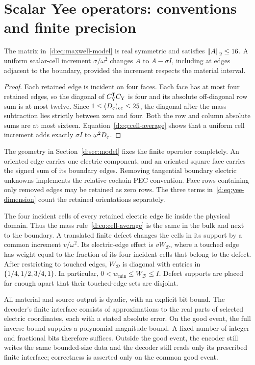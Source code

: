 \section{Scalar Yee operators: conventions and finite precision}\label{d:app:model}
\begin{lemma}\label{d:lem:pec}
The matrix in~\eqref{d:eq:maxwell-model} is real symmetric and satisfies $\left\lVert A\right\rVert_2\le16$. A uniform scalar-cell increment $\sigma/\omega^2$ changes $A$ to $A-\sigma I$, including at edges adjacent to the boundary, provided the increment respects the material interval.
\end{lemma}
\begin{proof}
Each retained edge is incident on four faces. Each face has at most four retained edges, so the diagonal of $C_{\rm Y}^{\mathsf T}C_{\rm Y}$ is four and its absolute off-diagonal row sum is at most twelve. Since $1\le(D_\varepsilon)_{ee}\le25$, the diagonal after the mass subtraction lies strictly between zero and four. Both the row and column absolute sums are at most sixteen. Equation~\eqref{d:eq:cell-average} shows that a uniform cell increment adds exactly $\sigma I$ to $\omega^2D_\varepsilon$.
\end{proof}

The geometry in Section~\ref{d:sec:model} fixes the finite operator completely. An oriented edge carries one electric component, and an oriented square face carries the signed sum of its boundary edges. Removing tangential boundary electric unknowns implements the relative-cochain PEC convention. Face rows containing only removed edges may be retained as zero rows. The three terms in~\eqref{d:eq:yee-dimension} count the retained orientations separately.

The four incident cells of every retained electric edge lie inside the physical domain. Thus the mass rule~\eqref{d:eq:cell-average} is the same in the bulk and next to the boundary. A translated finite defect changes the cells in its support by a common increment $v/\omega^2$. Its electric-edge effect is $vW_{\mathcal D}$, where a touched edge has weight equal to the fraction of its four incident cells that belong to the defect. After restricting to touched edges, $W_{\mathcal D}$ is diagonal with entries in $\{1/4,1/2,3/4,1\}$. In particular, $0<w_{\min}\le W_{\mathcal D}\le I$. Defect supports are placed far enough apart that their touched-edge sets are disjoint.

All material and source output is dyadic, with an explicit bit bound. The decoder's finite interface consists of approximations to the real parts of selected electric coordinates, each with a stated absolute error. On the good event, the full inverse bound supplies a polynomial magnitude bound. A fixed number of integer and fractional bits therefore suffices. Outside the good event, the encoder still writes the same bounded-size data and the decoder still reads only its prescribed finite interface; correctness is asserted only on the common good event.

